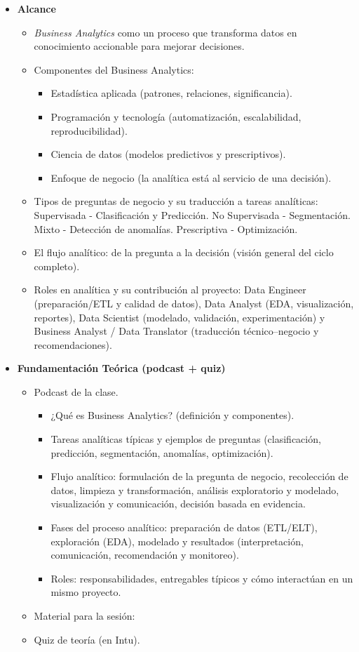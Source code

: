 \documentclass{article}
\begin{document}
\begin{itemize}
\item \textbf{Alcance}
\begin{itemize}
  \item \textit{Business Analytics} como un proceso que transforma datos en conocimiento accionable para mejorar decisiones.
  \item Componentes del Business Analytics:
  \begin{itemize}
    \item Estadística aplicada (patrones, relaciones, significancia).
    \item Programación y tecnología (automatización, escalabilidad, reproducibilidad).
    \item Ciencia de datos (modelos predictivos y prescriptivos).
    \item Enfoque de negocio (la analítica está al servicio de una decisión).
  \end{itemize}
  \item Tipos de preguntas de negocio y su traducción a tareas analíticas: Supervisada - Clasificación y Predicción. No Supervisada - Segmentación. Mixto - Detección de anomalías. Prescriptiva - Optimización.
  \item El flujo analítico: de la pregunta a la decisión (visión general del ciclo completo).
  \item Roles en analítica y su contribución al proyecto: Data Engineer (preparación/ETL y calidad de datos), Data Analyst (EDA, visualización, reportes), Data Scientist (modelado, validación, experimentación) y Business Analyst / Data Translator (traducción técnico--negocio y recomendaciones).
\end{itemize}

\item \textbf{Fundamentación Teórica (podcast + quiz)}
\begin{itemize}
  \item Podcast de la clase. %
  \begin{itemize}
    \item ¿Qué es Business Analytics? (definición y componentes).
    \item Tareas analíticas típicas y ejemplos de preguntas (clasificación, predicción, segmentación, anomalías, optimización).
    \item Flujo analítico: formulación de la pregunta de negocio, recolección de datos, limpieza y transformación, análisis exploratorio y modelado, visualización y comunicación, decisión basada en evidencia.
    \item Fases del proceso analítico: preparación de datos (ETL/ELT), exploración (EDA), modelado y resultados (interpretación, comunicación, recomendación y monitoreo).
    \item Roles: responsabilidades, entregables típicos y cómo interactúan en un mismo proyecto.
  \end{itemize}
  \item Material para la sesión: %
  \item Quiz de teoría (en Intu).
\end{itemize}


\end{itemize}
\end{document}
